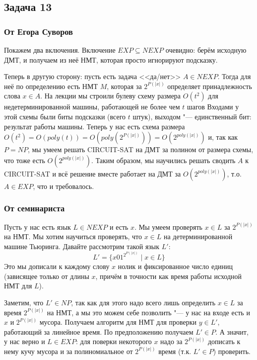 \subsection{Задача 13}
	\subsubsection{От Егора Суворов}
		Покажем два включения.
		Включение $EXP \subseteq NEXP$ очевидно: берём исходную ДМТ, и получаем
		из неё НМТ, которая просто игнорируют подсказку.

		Теперь в другую сторону: пусть есть задача <<да/нет>> $A \in NEXP$.
		Тогда для неё по определению есть НМТ $M$, которая за $2^{P(|x|)}$ определяет
		принадлежность слова $x \in A$.
		На лекции мы строили булеву схему размера $O(t^2)$ для недетерминированной машины, работающей не более чем $t$ шагов
		Входами у этой схемы были биты подсказки (всего $t$ штук), выходом "--- единственный бит: результат работы машины.
		Теперь у нас есть схема размера $O(t^2)=O(poly(t))=O(poly(2^{P(|x|)}))=O(2^{poly(|x|)})$ и,
		так как $P=NP$, мы умеем решать CIRCUIT-SAT на ДМТ за полином от размера схемы, что тоже есть $O(2^{poly(|x|)})$.
		Таким образом, мы научились решать сводить $A$ к CIRCUIT-SAT и всё решение вместе работает на ДМТ
		за $O(2^{poly(|x|)})$, т.о. $A \in EXP$, что и требовалось.

	\subsubsection{От семинариста}\label{prob13_sol2}
		Пусть у нас есть язык $L \in NEXP$ и есть $x$.
		Мы умеем проверять $x \in L$ за $2^{P(|x|)}$ на НМТ.
		Мы хотим научиться проверять, что $x\in L$ на детерминированной машине Тьюринга.
		Давайте рассмотрим такой язык $L'$:
		\[ L' = \{ x 0 1^{2^{P(|x|)}} \mid x \in L \} \]
		Это мы дописали к каждому слову $x$ нолик и фиксированное число единиц (зависящее только от длины $x$,
		причём в точности как время работы исходной НМТ для $L$).

		Заметим, что $L' \in NP$, так как для этого надо всего лишь определить
		$x \in L$ за время $2^{P(|x|)}$ на НМТ, а мы это можем себе позволить "--- у нас на входе
		есть и $x$ и $2^{P(|x|)}$ мусора.
		Получаем алгоритм для НМТ для проверки $y \in L'$, работающий за линейное время.
		По предположению получаем $L' \in P$.
		А значит, у нас верно и $L \in EXP$: для поверки некоторого $x$ надо за $2^{P(|x|)}$ дописать
		к нему кучу мусора и за полиномиальное от $2^{P(|x|)}$ время (т.к. $L' \in P$) проверить.

